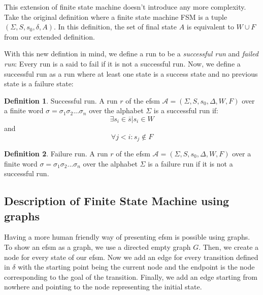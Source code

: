 \documentclass[12pt]{article}
\theoremstyle{definition}
\newtheorem{definition}{Definition}[section]
\theoremstyle{definition}
\theoremstyle{remark}
\newcommand{\A}{\mathcal{A}}
\begin{document}
This extension of finite state machine doesn't introduce any more complexity. Take the original definition where a finite state machine FSM is a tuple $(\Sigma, S, s_{0},\delta, A)$. In this definition, the set of final state $A$ is equivalent to $W \cup F$ from our extended definition.

With this new defintion in mind, we define a run to be a \textit{successful run} and \textit{failed run}: Every run is a said to fail if it is not a successful run. Now, we define a successful run as a run where at least one state is a success state and no previous state is a failure state:

\theoremstyle{definition}
\begin{definition}{Successful run.} A run $r$ of the \gls{efsm} $\A = (\Sigma, S, s_{0}, \Delta, W, F)$ over a finite word $\sigma = \sigma_1 \sigma_2 ... \sigma_n$ over the alphabet $\Sigma$ is a successful run if:
$$\exists s_i \in \overline{s} | s_{i} \in W$$ and $$\forall j < i: s_{j} \notin F$$
\end{definition}

\theoremstyle{definition}
\begin{definition}{Failure run.} A run $r$ of the \gls{efsm} $\A = (\Sigma, S, s_{0}, \Delta, W, F)$ over a finite word $\sigma = \sigma_1 \sigma_2 ... \sigma_n$ over the alphabet $\Sigma$ is a failure run if it is not a successful run.
\end{definition}



\subsection{Description of Finite State Machine using graphs}

Having a more human friendly way of presenting \gls{efsm} is possible using graphs. To show an \gls{efsm} as a graph, we use a directed empty graph $G$. Then, we create a node for every state of our \gls{efsm}. Now we add an edge for every transition defined in $\delta$ with the starting point being the current node and the endpoint is the node corresponding to the goal of the transition. Finally, we add an edge starting from nowhere and pointing to the node representing the initial state.\\
\end{document}
